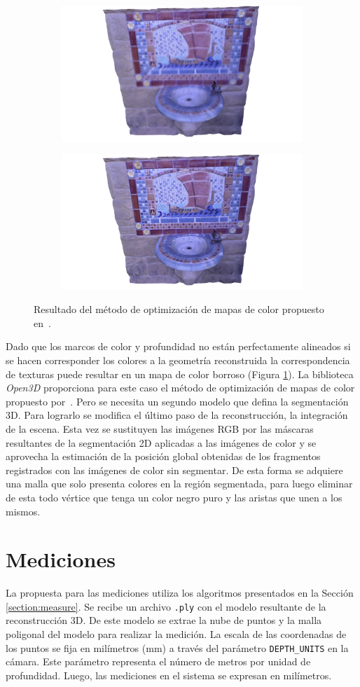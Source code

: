 {\begin{figure}[ht]
	\centering
	\begin{subfigure}
		\centering
		\includegraphics[width=.4\linewidth]{./Graphics/co1.png}
	\end{subfigure}
	\begin{subfigure}
		\centering
		\includegraphics[width=.4\linewidth]{./Graphics/co2.png}
	\end{subfigure}
	\caption{Resultado del método de optimización de mapas de color propuesto en~\cite{zhou2014color}.}
	\label{fig:optColor3d}
\end{figure}

Dado que los marcos de color y profundidad no están perfectamente alineados si se hacen corresponder los colores a la geometría reconstruida la correspondencia de texturas puede resultar en un mapa de color borroso (Figura \ref{fig:optColor3d}). La biblioteca \textit{Open3D} proporciona para este caso el método de optimización de mapas de color propuesto por~\cite{zhou2014color}. Pero se necesita un segundo modelo que defina la segmentación 3D. Para lograrlo se modifica el último paso de la reconstrucción, la integración de la escena. Esta vez se sustituyen las imágenes RGB por las máscaras resultantes de la segmentación 2D aplicadas a las imágenes de color y se aprovecha la estimación de la posición global obtenidas de los fragmentos registrados con las imágenes de color sin segmentar. De esta forma se adquiere una malla que solo presenta colores en la región segmentada, para luego eliminar de esta todo vértice que tenga un color negro puro y las aristas que unen a los mismos.

\section{Mediciones}

La propuesta para las mediciones utiliza los algoritmos presentados en la Sección \ref{section:measure}. Se recibe un archivo \texttt{.ply} con el modelo resultante de la reconstrucción 3D. De este modelo se extrae la nube de puntos y la malla poligonal del modelo para realizar la medición. La escala de las coordenadas de los puntos se fija en milímetros (mm) a través del parámetro \texttt{DEPTH\_UNITS} en la cámara. Este parámetro representa el número de metros por unidad de profundidad. Luego, las mediciones en el sistema se expresan en milímetros.

}
